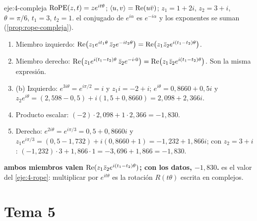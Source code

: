 \begin{solucion}{eje:4-compleja}
\datos $\operatorname{RoPE}(z,t)=ze^{it\theta}$; $\langle u,v\rangle=\operatorname{Re}(u\bar v)$; $z_1=1+2i$, $z_2=3+i$, $\theta=\pi/6$, $t_1=3$, $t_2=1$.
\planteamiento el conjugado de $e^{i\alpha}$ es $e^{-i\alpha}$ y los exponentes se suman (\cref{prop:rope-compleja}).
\pasos
\begin{enumerate}[label=\arabic*.]
  \item Miembro izquierdo: $\operatorname{Re}\bigl(z_1e^{it_1\theta}\,\bar z_2e^{-it_2\theta}\bigr)=\operatorname{Re}\bigl(z_1\bar z_2e^{i(t_1-t_2)\theta}\bigr)$.
  \item Miembro derecho: $\operatorname{Re}\bigl(z_1e^{i(t_1-t_2)\theta}\,\bar z_2e^{-i\cdot 0}\bigr)=\operatorname{Re}\bigl(z_1\bar z_2e^{i(t_1-t_2)\theta}\bigr)$. Son la misma expresión.
  \item (b) Izquierdo: $e^{3i\theta}=e^{i\pi/2}=i$ y $z_1i=-2+i$; $e^{i\theta}=0{,}8660+0{,}5i$ y $z_2e^{i\theta}=(2{,}598-0{,}5)+i(1{,}5+0{,}8660)=2{,}098+2{,}366i$.
  \item Producto escalar: $(-2)\cdot 2{,}098+1\cdot 2{,}366=-1{,}830$.
  \item Derecho: $e^{2i\theta}=e^{i\pi/3}=0{,}5+0{,}8660i$ y $z_1e^{i\pi/3}=(0{,}5-1{,}732)+i(0{,}8660+1)=-1{,}232+1{,}866i$; con $z_2=3+i$: $(-1{,}232)\cdot 3+1{,}866\cdot 1=-3{,}696+1{,}866=-1{,}830$.
\end{enumerate}
\resultado \textbf{ambos miembros valen $\operatorname{Re}(z_1\bar z_2e^{i(t_1-t_2)\theta})$; con los datos, $-1{,}830$.}
\comprobacion es el valor del \cref{eje:4-rope}: multiplicar por $e^{it\theta}$ es la rotación $R(t\theta)$ escrita en complejos.
\end{solucion}

\section{Tema 5}

